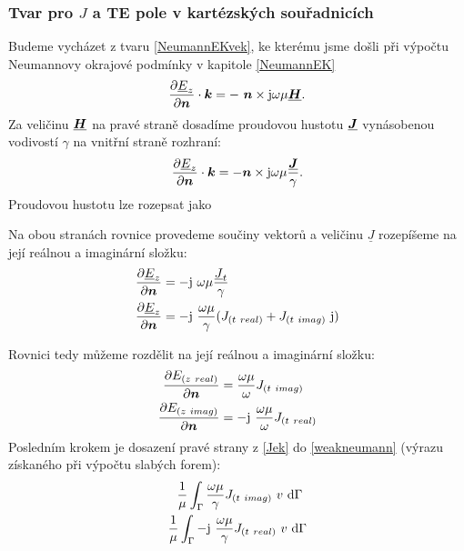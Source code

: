 \documentclass[12pt,a4paper,oneside]{article}
\numberwithin{equation}{section} %
\numberwithin{figure}{section} %
\numberwithin{table}{section} %
\newcommand{\mj}{\mathrm{j}} %
\renewcommand{\vec}[1]{\mbox{\boldmath$#1$}} %
\newcommand{\faz}[1]{{\underline{#1}}} %
\begin{document}
\subsubsection*{Tvar pro \faz{\vec{J}} a TE pole v kartézských souřadnicích}
Budeme vycházet z tvaru \ref{NeumannEKvek}, ke kterému jsme došli při výpočtu Neumannovy okrajové podmínky v kapitole \ref{NeumannEK}
\begin{equation}
\frac{\partial \faz{E}_z}{\partial \vec{n}} \cdot \vec{k} = - ~ \vec{n} \times \mj \omega \mu \faz{\vec{H}}.
\end{equation}
Za veličinu $\faz{\vec{H}}$ na pravé straně dosadíme proudovou hustotu $\faz{\vec{J}}$ vynásobenou vodivostí $\gamma$ na vnitřní straně rozhraní:
\begin{equation}
\frac{\partial \faz{E}_z}{\partial \vec{n}} \cdot \vec{k} = - \vec{n} \times \mj \omega \mu \frac{\faz{\vec{J}}}{\gamma}.
\end{equation}
Proudovou hustotu lze rozepsat jako 

Na obou stranách rovnice provedeme součiny vektorů a veličinu $\faz{J}$ rozepíšeme na její reálnou a imaginární složku:
\begin{subequations}
\begin{align}
\frac{\partial \faz{E}_z}{\partial \vec{n}} &= - \mj ~ \omega \mu \frac{\faz{J} _t}{\gamma}
\\
\frac{\partial \faz{E}_z}{\partial \vec{n}} &= - \mj ~ \frac{\omega \mu}{\gamma} (J _{(t~real)} + J _{(t~imag)} ~ \mj)
\end{align}
\end{subequations}

Rovnici tedy můžeme rozdělit na její reálnou a imaginární složku:
\begin{subequations}
\label{Jek}
\begin{align}
\frac{\partial E _{(z~real)}}{\partial \vec{n}} &= \frac{\omega \mu}{\omega}  J _{(t~imag)}
\\
\frac{\partial E _{(z~imag)}}{\partial \vec{n}} &= - \mj ~ \frac{\omega \mu}{\omega} J _{(t~real)}
\end{align}
\end{subequations}
Posledním krokem je dosazení pravé strany z \ref{Jek} do \ref{weakneumann} (výrazu získaného při výpočtu slabých forem):
\begin{subequations}
\begin{align}
\frac{1}{\mu} \int _{\Gamma} \frac{\omega \mu}{\gamma} J _{(t~imag)} ~ v ~ \ud \Gamma ~
\\
\frac{1}{\mu} \int _{\Gamma} - \mj ~ \frac{\omega \mu}{\gamma} J _{(t~real)} ~ v ~ \ud \Gamma
\end{align}
\end{subequations}
\end{document}
